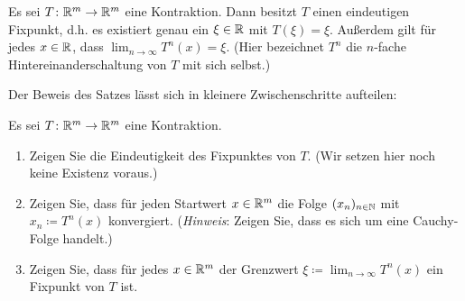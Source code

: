 \documentclass[a4paper,10pt]{article}
\begin{document}
\begin{thrm}
 Es sei $T \colon \mathbb{R}^m \to \mathbb{R}^m$ eine Kontraktion. Dann besitzt $T$ einen eindeutigen Fixpunkt, d.h. es existiert genau ein $\xi \in \mathbb{R}$ mit $T(\xi) = \xi$. Außerdem gilt für jedes $x \in \mathbb{R}$, dass $\lim_{n \to \infty} T^n(x) = \xi$. (Hier bezeichnet $T^n$ die $n$-fache Hintereinanderschaltung von $T$ mit sich selbst.)
\end{thrm}


Der Beweis des Satzes lässt sich in kleinere Zwischenschritte aufteilen:


\begin{question}
 Es sei $T \colon \mathbb{R}^m \to \mathbb{R}^m$ eine Kontraktion.
 \begin{enumerate}
  \item
   Zeigen Sie die Eindeutigkeit des Fixpunktes von $T$. (Wir setzen hier noch keine Existenz voraus.)
  \item
   Zeigen Sie, dass für jeden Startwert $x \in \mathbb{R}^m$ die Folge $(x_n)_{n \in \mathbb{N}}$ mit $x_n \coloneqq T^n(x)$ konvergiert. (\emph{Hinweis}: Zeigen Sie, dass es sich um eine Cauchy-Folge handelt.)
  \item
   Zeigen Sie, dass für jedes $x \in \mathbb{R}^m$ der Grenzwert $\xi \coloneqq \lim_{n \to \infty} T^n(x)$ ein Fixpunkt von $T$ ist.
 \end{enumerate}
\end{question}
\end{document}

